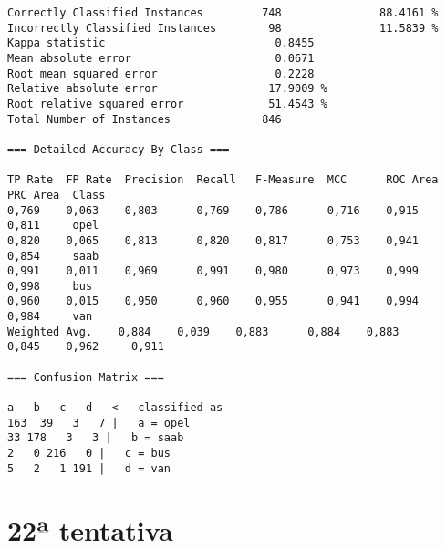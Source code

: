 \documentclass[
	article,			%
	11pt,				%
	oneside,			%
	a4paper,			%
	english,			%
	brazil,				%
	sumario=tradicional
	]{abntex2}
\begin{document}
\begin{lstlisting}
Correctly Classified Instances         748               88.4161 %
Incorrectly Classified Instances        98               11.5839 %
Kappa statistic                          0.8455
Mean absolute error                      0.0671
Root mean squared error                  0.2228
Relative absolute error                 17.9009 %
Root relative squared error             51.4543 %
Total Number of Instances              846     

=== Detailed Accuracy By Class ===

TP Rate  FP Rate  Precision  Recall   F-Measure  MCC      ROC Area  PRC Area  Class
0,769    0,063    0,803      0,769    0,786      0,716    0,915     0,811     opel
0,820    0,065    0,813      0,820    0,817      0,753    0,941     0,854     saab
0,991    0,011    0,969      0,991    0,980      0,973    0,999     0,998     bus
0,960    0,015    0,950      0,960    0,955      0,941    0,994     0,984     van
Weighted Avg.    0,884    0,039    0,883      0,884    0,883      0,845    0,962     0,911     

=== Confusion Matrix ===

a   b   c   d   <-- classified as
163  39   3   7 |   a = opel
33 178   3   3 |   b = saab
2   0 216   0 |   c = bus
5   2   1 191 |   d = van

\end{lstlisting}

\newpage

\section{22ª tentativa}
\end{document}
